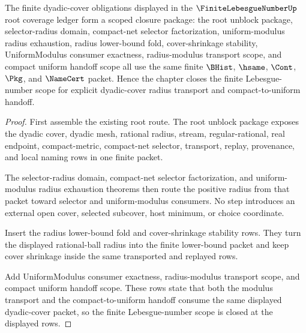 \begin{theorem}
\label{thm:finite-lebesgue-number-scoped-closure-package}
The finite dyadic-cover obligations displayed in the $\FiniteLebesgueNumberUp$ root coverage ledger form a scoped closure package: the root unblock package, selector-radius domain, compact-net selector factorization, uniform-modulus radius exhaustion, radius lower-bound fold, cover-shrinkage stability, UniformModulus consumer exactness, radius-modulus transport scope, and compact uniform handoff scope all use the same finite $\BHist$, $\hsame$, $\Cont$, $\Pkg$, and $\NameCert$ packet. Hence the chapter closes the finite Lebesgue-number scope for explicit dyadic-cover radius transport and compact-to-uniform handoff.
\end{theorem}
\begin{proof}
First assemble the existing root route. The root unblock package exposes the dyadic cover, dyadic mesh, rational radius, stream, regular-rational, real endpoint, compact-metric, compact-net selector, transport, replay, provenance, and local naming rows in one finite packet.

The selector-radius domain, compact-net selector factorization, and uniform-modulus radius exhaustion theorems then route the positive radius from that packet toward selector and uniform-modulus consumers. No step introduces an external open cover, selected subcover, host minimum, or choice coordinate.

Insert the radius lower-bound fold and cover-shrinkage stability rows. They turn the displayed rational-ball radius into the finite lower-bound packet and keep cover shrinkage inside the same transported and replayed rows.

Add UniformModulus consumer exactness, radius-modulus transport scope, and compact uniform handoff scope. These rows state that both the modulus transport and the compact-to-uniform handoff consume the same displayed dyadic-cover packet, so the finite Lebesgue-number scope is closed at the displayed rows.
\end{proof}

